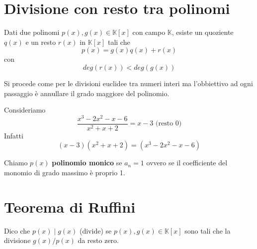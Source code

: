 \section{Divisione con resto tra polinomi}

\begin{theorem}
	Dati due polinomi $p(x), g(x) \in \mathbb{K}[x]$ con campo $\mathbb{K}$, esiste un
	quoziente $q(x)$ e un resto $r(x)$ in $\mathbb{K}[x]$ tali che
	\begin{equation*}
		p(x) = g(x) q(x) + r(x)
	\end{equation*}
	con
	\begin{equation*}
		deg(r(x)) < deg(g(x))
	\end{equation*}
\end{theorem}

Si procede come per le divisioni euclidee tra numeri interi ma l'obbiettivo ad ogni passaggio
\`e annullare il grado maggiore del polinomio.

\begin{example}
	Consideriamo
	\begin{equation*}
		\frac{x^3 - 2x^2 - x -6}{x^2 + x + 2} = x - 3 \text{ (resto 0)}
	\end{equation*}
	Infatti
	\begin{equation*}
		(x - 3)(x^2 + x + 2) = (x^3 - 2x^2 - x - 6)
	\end{equation*}
\end{example}

\begin{definition}
	Chiamo $p(x)$ \textbf{polinomio monico} se $a_n = 1$ ovvero se il coefficiente del monomio
	di grado massimo \`e proprio 1.
\end{definition}

\section{Teorema di Ruffini}
\begin{definition}
	Dico che $p(x) \mid g(x)$ (divide) se $p(x), g(x) \in \mathbb{K}[x]$ sono tali che
	la divisione $g(x) / p(x)$ da resto zero.
\end{definition}

